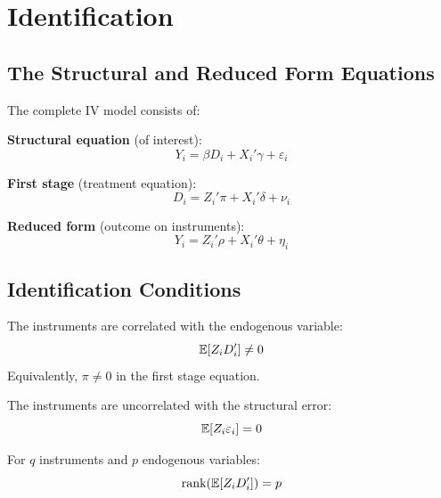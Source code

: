 \section{Identification}
\label{sec:iv_identification}

\subsection{The Structural and Reduced Form Equations}

The complete IV model consists of:

\textbf{Structural equation} (of interest):
\begin{equation}
Y_i = \beta D_i + X_i'\gamma + \varepsilon_i
\end{equation}

\textbf{First stage} (treatment equation):
\begin{equation}
D_i = Z_i'\pi + X_i'\delta + \nu_i
\label{eq:first_stage}
\end{equation}

\textbf{Reduced form} (outcome on instruments):
\begin{equation}
Y_i = Z_i'\rho + X_i'\theta + \eta_i
\label{eq:reduced_form}
\end{equation}

\subsection{Identification Conditions}

\begin{assumption}[Relevance]
\label{ass:relevance}
The instruments are correlated with the endogenous variable:
\begin{equation}
\mathbb{E}[Z_i D_i'] \neq 0
\end{equation}
Equivalently, $\pi \neq 0$ in the first stage equation.
\end{assumption}

\begin{assumption}
\label{ass:exclusion}
The instruments are uncorrelated with the structural error:
\begin{equation}
\mathbb{E}[Z_i \varepsilon_i] = 0
\end{equation}
\end{assumption}

\begin{assumption}
\label{ass:rank}
For $q$ instruments and $p$ endogenous variables:
\begin{equation}
\text{rank}(\mathbb{E}[Z_i D_i']) = p
\end{equation}
\end{assumption}

